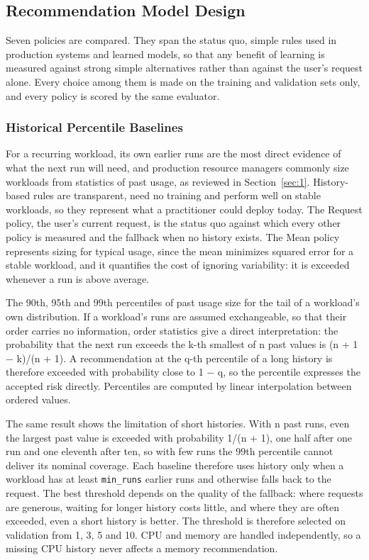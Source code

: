 \documentclass{IEEEtran}
\begin{document}
\subsection{Recommendation Model Design}\label{sec:4.2}

Seven policies are compared. They span the status quo, simple rules used in production systems and learned models, so that any benefit of learning is measured against strong simple alternatives rather than against the user's request alone. Every choice among them is made on the training and validation sets only, and every policy is scored by the same evaluator.

\subsubsection{Historical Percentile Baselines}\label{sec:4.2.1}

For a recurring workload, its own earlier runs are the most direct evidence of what the next run will need, and production resource managers commonly size workloads from statistics of past usage, as reviewed in Section~\ref{sec:1}. History-based rules are transparent, need no training and perform well on stable workloads, so they represent what a practitioner could deploy today. The Request policy, the user's current request, is the status quo against which every other policy is measured and the fallback when no history exists. The Mean policy represents sizing for typical usage, since the mean minimizes squared error for a stable workload, and it quantifies the cost of ignoring variability: it is exceeded whenever a run is above average.

The 90th, 95th and 99th percentiles of past usage size for the tail of a workload's own distribution. If a workload's runs are assumed exchangeable, so that their order carries no information, order statistics give a direct interpretation: the probability that the next run exceeds the k-th smallest of n past values is (n + 1 $-$ k)/(n + 1). A recommendation at the q-th percentile of a long history is therefore exceeded with probability close to 1 $-$ q, so the percentile expresses the accepted risk directly. Percentiles are computed by linear interpolation between ordered values.

The same result shows the limitation of short histories. With n past runs, even the largest past value is exceeded with probability 1/(n + 1), one half after one run and one eleventh after ten, so with few runs the 99th percentile cannot deliver its nominal coverage. Each baseline therefore uses history only when a workload has at least \texttt{min\_runs} earlier runs and otherwise falls back to the request. The best threshold depends on the quality of the fallback: where requests are generous, waiting for longer history costs little, and where they are often exceeded, even a short history is better. The threshold is therefore selected on validation from 1, 3, 5 and 10. CPU and memory are handled independently, so a missing CPU history never affects a memory recommendation.
\end{document}
